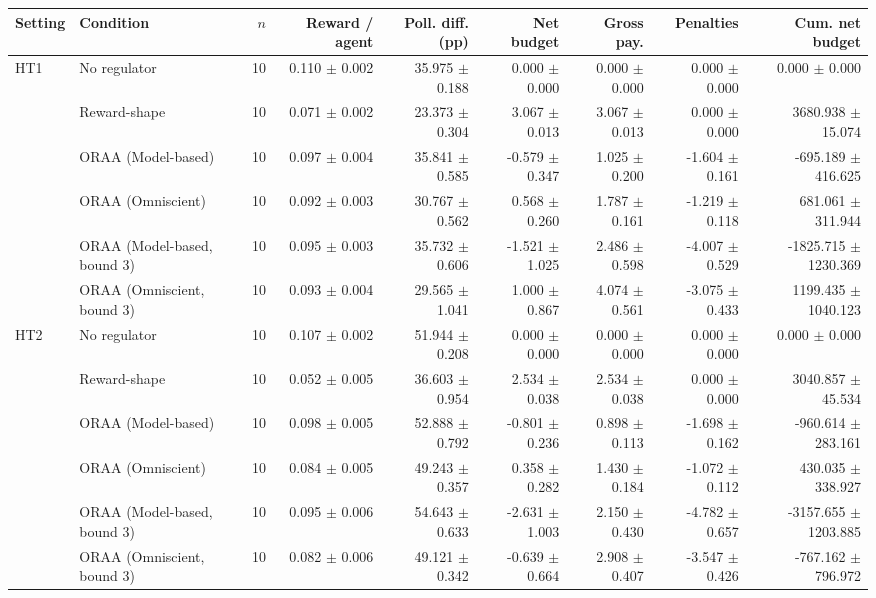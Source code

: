 \begin{tabular}{llrrrrrrr}
\toprule
Setting & Condition & $n$ & Reward / agent & Poll. diff. (pp) & Net budget & Gross pay. & Penalties & Cum. net budget \\
\midrule
HT1 & No regulator & 10 & 0.110 $\pm$ 0.002 & 35.975 $\pm$ 0.188 & 0.000 $\pm$ 0.000 & 0.000 $\pm$ 0.000 & 0.000 $\pm$ 0.000 & 0.000 $\pm$ 0.000 \\
 & Reward-shape & 10 & 0.071 $\pm$ 0.002 & 23.373 $\pm$ 0.304 & 3.067 $\pm$ 0.013 & 3.067 $\pm$ 0.013 & 0.000 $\pm$ 0.000 & 3680.938 $\pm$ 15.074 \\
 & ORAA (Model-based) & 10 & 0.097 $\pm$ 0.004 & 35.841 $\pm$ 0.585 & -0.579 $\pm$ 0.347 & 1.025 $\pm$ 0.200 & -1.604 $\pm$ 0.161 & -695.189 $\pm$ 416.625 \\
 & ORAA (Omniscient) & 10 & 0.092 $\pm$ 0.003 & 30.767 $\pm$ 0.562 & 0.568 $\pm$ 0.260 & 1.787 $\pm$ 0.161 & -1.219 $\pm$ 0.118 & 681.061 $\pm$ 311.944 \\
 & ORAA (Model-based, bound 3) & 10 & 0.095 $\pm$ 0.003 & 35.732 $\pm$ 0.606 & -1.521 $\pm$ 1.025 & 2.486 $\pm$ 0.598 & -4.007 $\pm$ 0.529 & -1825.715 $\pm$ 1230.369 \\
 & ORAA (Omniscient, bound 3) & 10 & 0.093 $\pm$ 0.004 & 29.565 $\pm$ 1.041 & 1.000 $\pm$ 0.867 & 4.074 $\pm$ 0.561 & -3.075 $\pm$ 0.433 & 1199.435 $\pm$ 1040.123 \\
\addlinespace
HT2 & No regulator & 10 & 0.107 $\pm$ 0.002 & 51.944 $\pm$ 0.208 & 0.000 $\pm$ 0.000 & 0.000 $\pm$ 0.000 & 0.000 $\pm$ 0.000 & 0.000 $\pm$ 0.000 \\
 & Reward-shape & 10 & 0.052 $\pm$ 0.005 & 36.603 $\pm$ 0.954 & 2.534 $\pm$ 0.038 & 2.534 $\pm$ 0.038 & 0.000 $\pm$ 0.000 & 3040.857 $\pm$ 45.534 \\
 & ORAA (Model-based) & 10 & 0.098 $\pm$ 0.005 & 52.888 $\pm$ 0.792 & -0.801 $\pm$ 0.236 & 0.898 $\pm$ 0.113 & -1.698 $\pm$ 0.162 & -960.614 $\pm$ 283.161 \\
 & ORAA (Omniscient) & 10 & 0.084 $\pm$ 0.005 & 49.243 $\pm$ 0.357 & 0.358 $\pm$ 0.282 & 1.430 $\pm$ 0.184 & -1.072 $\pm$ 0.112 & 430.035 $\pm$ 338.927 \\
 & ORAA (Model-based, bound 3) & 10 & 0.095 $\pm$ 0.006 & 54.643 $\pm$ 0.633 & -2.631 $\pm$ 1.003 & 2.150 $\pm$ 0.430 & -4.782 $\pm$ 0.657 & -3157.655 $\pm$ 1203.885 \\
 & ORAA (Omniscient, bound 3) & 10 & 0.082 $\pm$ 0.006 & 49.121 $\pm$ 0.342 & -0.639 $\pm$ 0.664 & 2.908 $\pm$ 0.407 & -3.547 $\pm$ 0.426 & -767.162 $\pm$ 796.972 \\

\end{tabular}
